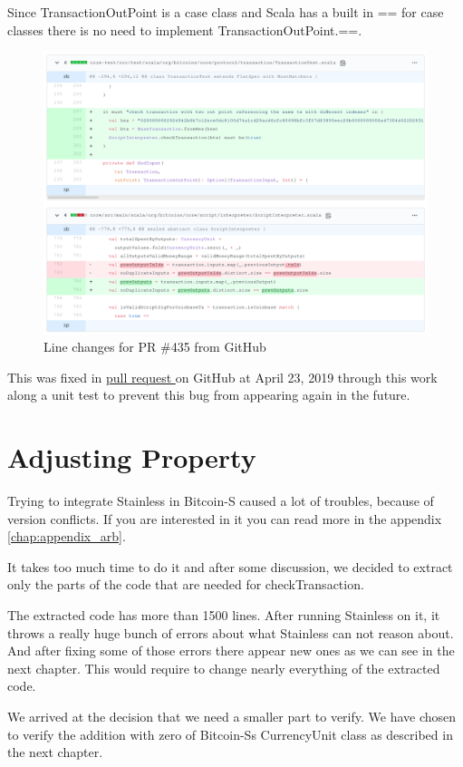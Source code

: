 Since TransactionOutPoint is a case class and Scala has a built in == for case classes there is no need to implement TransactionOutPoint.==.
\begin{figure}[H]
	\centering
		\includegraphics[scale=0.396]{images/bitcoin-s-pr.png}
	\caption{Line changes for PR \#435 from GitHub}
	\label{fig:output1}
\end{figure}

This was fixed in \href{https://github.com/bitcoin-s/bitcoin-s/pull/435}{pull request } on GitHub at April 23, 2019 through this work along a unit test to prevent this bug from appearing again in the future.


\section{Adjusting Property}

Trying to integrate Stainless in Bitcoin-S caused a lot of troubles, because of version conflicts.
If you are interested in it you can read more in the appendix \ref{chap:appendix_arb}.

It takes too much time to do it and after some discussion, we decided to extract only the parts of the code that are needed for checkTransaction.

The extracted code has more than 1500 lines.
After running Stainless on it, it throws a really huge bunch of errors about what Stainless can not reason about.
And after fixing some of those errors there appear new ones as we can see in the next chapter.
This would require to change nearly everything of the extracted code.

We arrived at the decision that we need a smaller part to verify.
We have chosen to verify the addition with zero of Bitcoin-Ss CurrencyUnit class as described in the next chapter.
